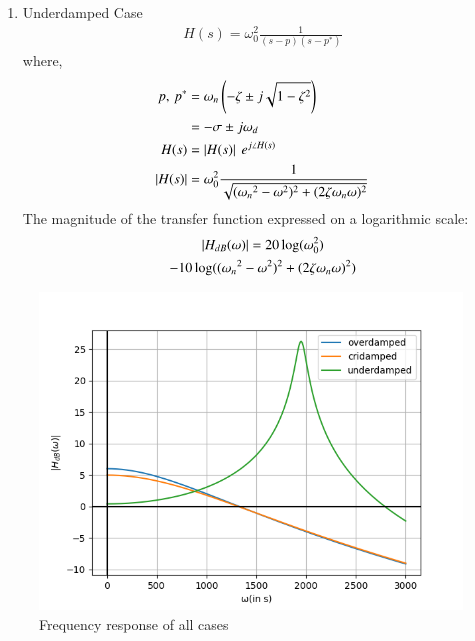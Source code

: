 \documentclass[journal,12pt,twocolumn]{IEEEtran}
\theoremstyle{remark}
\begin{document}
\begin{enumerate}
    \item Underdamped Case
    \begin{align}
        H(s)=\omega_0^2\frac{1}{(s-p)(s-p^\ast)}
    \end{align}
    where,
    \begin{align}
        p,\,p^\ast &=\omega_n\left(-\zeta \pm j\sqrt{1-\zeta^2}\right)\\
        &= -\sigma\pm j\omega_d\\
        H(s) &= \left\vert H(s)\right\vert\ e^{j\angle{H(s)}}\\
        \left\vert H(s)\right\vert &= \omega_0^2\frac{1}{\sqrt{({\omega_n}^2-\omega^2)^2+(2\zeta\omega_n \omega)^2}}
    \end{align}
    The magnitude of the transfer function expressed on a logarithmic scale:
    \begin{multline}
        \left\vert H_{dB}(\omega)\right\vert = 20\log(\omega_0^2) \\-10\log(({\omega_n}^2-\omega^2)^2+(2\zeta\omega_n \omega)^2)
    \end{multline}
\end{enumerate}
\begin{figure}[!ht]
    \centering
    \includegraphics[width=\columnwidth]{figs/h_db_plot.png}
    \caption{Frequency response of all cases}
\end{figure}
\end{document}
